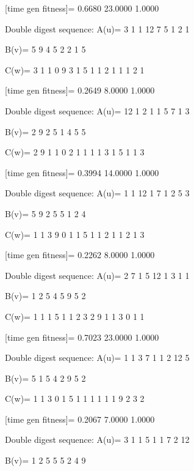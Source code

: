 [time gen fitness]=
    0.6680   23.0000    1.0000

Double digest sequence:
A(u)=
     3     1     1    12     7     5     1     2     1

B(v)=
     5     9     4     5     2     2     1     5

C(w)=
     3     1     1     0     9     3     1     5     1     1     2     1     1     1     2     1

[time gen fitness]=
    0.2649    8.0000    1.0000

Double digest sequence:
A(u)=
    12     1     2     1     1     5     7     1     3

B(v)=
     2     9     2     5     1     4     5     5

C(w)=
     2     9     1     1     0     2     1     1     1     1     3     1     5     1     1     3

[time gen fitness]=
    0.3994   14.0000    1.0000

Double digest sequence:
A(u)=
     1     1    12     1     7     1     2     5     3

B(v)=
     5     9     2     5     5     1     2     4

C(w)=
     1     1     3     9     0     1     1     5     1     1     2     1     1     2     1     3

[time gen fitness]=
    0.2262    8.0000    1.0000

Double digest sequence:
A(u)=
     2     7     1     5    12     1     3     1     1

B(v)=
     1     2     5     4     5     9     5     2

C(w)=
     1     1     1     5     1     1     2     3     2     9     1     1     3     0     1     1

[time gen fitness]=
    0.7023   23.0000    1.0000

Double digest sequence:
A(u)=
     1     1     3     7     1     1     2    12     5

B(v)=
     5     1     5     4     2     9     5     2

C(w)=
     1     1     3     0     1     5     1     1     1     1     1     1     9     2     3     2

[time gen fitness]=
    0.2067    7.0000    1.0000

Double digest sequence:
A(u)=
     3     1     1     5     1     1     7     2    12

B(v)=
     1     2     5     5     5     2     4     9


